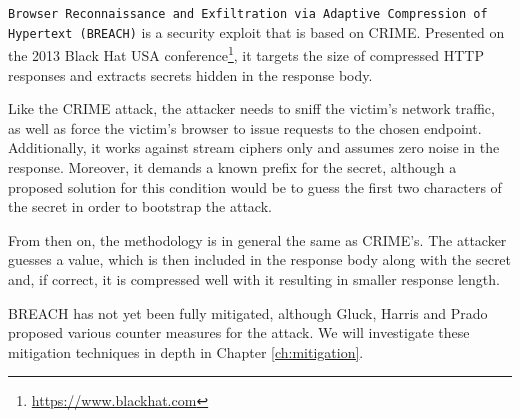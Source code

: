 \texttt{Browser Reconnaissance and Exfiltration via Adaptive Compression of
Hypertext (BREACH)} \cite{breach} is a security exploit that is based on CRIME.
Presented on the 2013 Black Hat USA
conference\footnote{\url{https://www.blackhat.com}}, it targets the size of
compressed HTTP responses and extracts secrets hidden in the response body.

Like the CRIME attack, the attacker needs to sniff the victim's network traffic,
as well as force the victim's browser to issue requests to the chosen endpoint.
Additionally, it works against stream ciphers only and assumes zero noise in the
response. Moreover, it demands a known prefix for the secret, although a
proposed solution for this condition would be to guess the first two characters
of the secret in order to bootstrap the attack.

From then on, the methodology is in general the same as CRIME's. The attacker
guesses a value, which is then included in the response body along with the
secret and, if correct, it is compressed well with it resulting in smaller
response length.

BREACH has not yet been fully mitigated, although Gluck, Harris and Prado
proposed various counter measures for the attack. We will investigate these
mitigation techniques in depth in Chapter \ref{ch:mitigation}.
